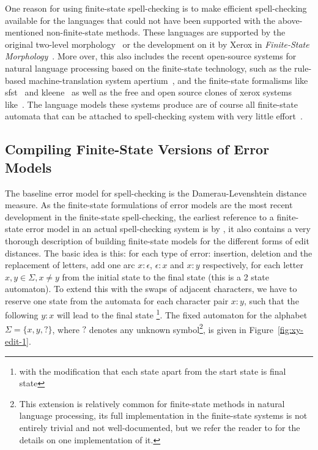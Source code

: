 \documentclass[a4paper,12pt]{article}
\begin{document}
One reason for using finite-state spell-checking is to make efficient
spell-checking available for the languages that could not have been supported
with the above-mentioned non-finite-state methods. These languages are
supported by the original two-level morphology~\cite[]{koskenniemi/1983} or the
development on it by Xerox in \emph{Finite-State
Morphology}~\cite[]{beesley2003finite}.  More over, this also includes the
recent open-source systems for natural language processing based on the
finite-state technology, such as the rule-based machine-translation system
apertium~\cite[]{apertium2010}, and the finite-state formalisms like
sfst~\cite[]{schmid2006programming} and kleene~\cite[]{beesley2012kleene} as
well as the free and open source clones of xerox systems
like~\cite{hfst/2012/cla,hulden2009foma}.  The language models these systems
produce are of course all finite-state automata that can be attached to
spell-checking system with very little
effort~\cite[e.g.][]{pirinen2012compiling}.

\subsection{Compiling Finite-State Versions of Error Models}
\label{subsec:error-models}

The baseline error model for spell-checking is the Damerau-Levenshtein distance
measure. As the finite-state formulations of error models are the most recent
development in the finite-state spell-checking, the earliest reference to a
finite-state error model in an actual spell-checking system is by
\cite{schulz/2002}, it also contains a very thorough description of building
finite-state models for the different forms of edit distances. The basic
idea is this: for each type of error: insertion, deletion and the replacement
of
letters, add one arc $x:\epsilon$, $\epsilon:x$ and $x:y$ respectively, for
each letter $x, y \in \Sigma, x \neq y$ from the initial state to the final
state (this is a 2 state automaton). To extend this with the swaps of adjacent
characters, we have to reserve one state from the automata for each character
pair $x:y$, such that the following $y:x$ will lead to the final state
\cite[]{pirinen/2010/lrec}\footnote{with the modification that each state apart
from the start state is final state}.  The fixed automaton for the alphabet
$\Sigma = \{x, y, ?\}$, where $?$ denotes any unknown symbol\footnote{This
    extension is relatively common for finite-state methods in natural language
processing, its full implementation in the finite-state systems is not entirely
trivial and not well-documented, but we refer the reader to
\cite[]{beesley2003finite} for the details on one implementation of it.}, is
given in Figure~\ref{fig:xy-edit-1}.
\end{document}
